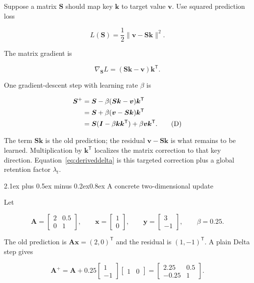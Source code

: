 \documentclass[11pt]{article}
\makeatletter
\newcommand{\vect}[1]{\bm{#1}}
\newcommand{\trans}{^{\mathsf T}}
\renewcommand\subsection{\@startsection{subsection}{2}{0pt}%
  {2.1ex plus 0.5ex minus 0.2ex}{0.8ex}%
  {\normalfont\sffamily\large\bfseries\color{Ink}}}
\makeatother
\begin{document}
Suppose a matrix $\vect S$ should map key $\vect k$ to target value $\vect v$.
Use squared prediction loss

\[
  L(\vect S)=\frac12\lVert\vect v-\vect S\vect k\rVert^2.
\]

The matrix gradient is

\[
  \nabla_{\vect S}L=(\vect S\vect k-\vect v)\vect k\trans.
\]

One gradient-descent step with learning rate $\beta$ is

\begin{align}
  \vect S^+
  &=\vect S-\beta(\vect S\vect k-\vect v)\vect k\trans \notag\\
  &=\vect S+\beta(\vect v-\vect S\vect k)\vect k\trans \notag\\
  &=\vect S(\vect I-\beta\vect k\vect k\trans)
    +\beta\vect v\vect k\trans.
  \tag{D}\label{eq:deltarule}
\end{align}

The term $\vect S\vect k$ is the old prediction; the residual
$\vect v-\vect S\vect k$ is what remains to be learned. Multiplication by
$\vect k\trans$ localizes the matrix correction to that key direction.
Equation~\eqref{eq:deriveddelta} is this targeted correction plus a global
retention factor $\lambda_t$.

\subsection{A concrete two-dimensional update}

Let

\[
  \vect A=
  \begin{bmatrix}2&0.5\\0&1\end{bmatrix},\qquad
  \vect x=\begin{bmatrix}1\\0\end{bmatrix},\qquad
  \vect y=\begin{bmatrix}3\\-1\end{bmatrix},\qquad
  \beta=0.25.
\]

The old prediction is $\vect A\vect x=(2,0)\trans$ and the residual is
$(1,-1)\trans$. A plain Delta step gives

\[
  \vect A^+
  =\vect A+0.25
    \begin{bmatrix}1\\-1\end{bmatrix}
    \begin{bmatrix}1&0\end{bmatrix}
  =\begin{bmatrix}2.25&0.5\\-0.25&1\end{bmatrix}.
\]
\end{document}
